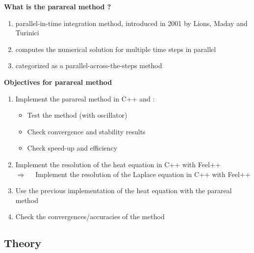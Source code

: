 \begin{frame}{}
	
	\textbf{What is the parareal method ?}
	
	\begin{enumerate}[\textbullet]
		\item parallel-in-time integration method, introduced in 2001 by Lions, Maday and Turinici~\cite{partie2_ref1}
		\item computes the numerical solution for multiple time steps in parallel
		\item categorized as a parallel-across-the-steps method 
	\end{enumerate}

	\textbf{Objectives for parareal method}

	\begin{enumerate}[\textbullet]
		\item Implement the parareal method in C++ and :
		\begin{itemize}
			\item Test the method (with oscillator)
			\item Check convergence and stability results
			\item Check speed-up and efficiency 
		\end{itemize}
		\item Implement the resolution of the heat equation in C++ with Feel++ \\
		$\Rightarrow \quad $ Implement the resolution of the Laplace equation in C++ with Feel++ \\
		\item Use the previous implementation of the heat equation with the parareal method
		\item Check the convergences/accuracies of the method
	\end{enumerate}
	
\end{frame}


\subsection{Theory}

